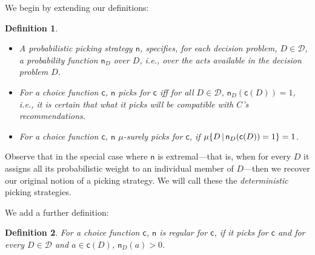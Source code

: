 \documentclass[a4paper]{article}
\newtheorem{definition}{Definition}
\newcommand\A{\mathcal{A}}
\renewcommand\P{\mathbb{P}} %
\newcommand\EU{\mathrm{EU}}
\newcommand\REU{\mathrm{REU}}
\newcommand\EAd{\mathrm{EAd}}
\newcommand\Maximin{\Gamma}
\newcommand{\D}{\mathcal{D}}
\newcommand\s{\mathsf{s}}
\renewcommand\c{\mathsf{c}} %
\newcommand{\n}{\mathsf{n}}
\newcommand{\IP}{\P}
\newcommand{\todoold}[2][]{\todo[backgroundcolor=white,bordercolor=orange!10,linecolor=gray!10, #1,caption={},textcolor=gray]{Pre-rev: #2}}
\newcommand{\todooldinfo}[2][]{\todoold[#1]{#2}}
\renewcommand{\color}[1]{}
\newcommand\SetDelimiter[1][]{
	\nonscript\,#1\vert \allowbreak \nonscript\,\mathopen{}}
\providecommand\given{\SetDelimiter}
\renewcommand{\emptyset}{\varnothing}
\newenvironment{CCM rewritten}
{\begingroup\color{blue}} %
{\endgroup}              %
\begin{document}
We begin by extending our definitions:
\begin{definition}\label{def:nu stuff}\ 
	\begin{itemize}
		\item %
		A \emph{probabilistic picking strategy} $\n$, specifies, for each decision problem, $D\in\D$, a probability function $\n_D$ over $D$, i.e., over the acts available in the decision problem $D$.
		\item For a choice function $\c$,  $\n$ \emph{picks for $\c$} iff for all $D\in\D$,  $\n_D(\c(D))=1$, i.e., it is certain that what it picks will be compatible with $C$'s recommendations.
		\item For a choice function $\c$, $\n$ \emph{$\mu$-surely picks for $\c$}, if $\mu\{D\given \n_D(\c(D))=1\}=1$.
 	\end{itemize}
\end{definition}
Observe that in the special case where $\n$ is extremal---that is, when for every $D$ it assigns all its probabilistic weight to an individual member of $D$---then we recover our original notion of a picking strategy. We will call these the \emph{deterministic} picking strategies. 

We add a further definition: 
\begin{definition}
For a choice function $\c$,  \emph{$\n$ is regular for $\c$}, if it picks for $\c$ and for every $D\in\D$ and $a\in\c(D)$, $\n_D(a)>0$. %
\end{definition}


\end{document}
